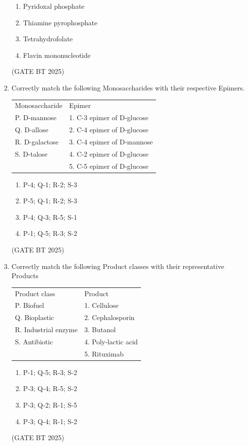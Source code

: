 \documentclass[journal,12pt,onecolumn]{IEEEtran}
\theoremstyle{remark}
\begin{document}
\begin{enumerate}
\begin{enumerate}
    \item Pyridoxal phosphate
    \item Thiamine pyrophosphate
    \item Tetrahydrofolate
    \item Flavin mononucleotide
\end{enumerate}  
\hfill (GATE BT 2025)

\item Correctly match the following Monosaccharides with their respective Epimers.  

\begin{tabular}{ll}
Monosaccharide & Epimer \\
P. D-mannose & 1. C-3 epimer of D-glucose \\
Q. D-allose & 2. C-4 epimer of D-glucose \\
R. D-galactose & 3. C-4 epimer of D-mannose \\
S. D-talose & 4. C-2 epimer of D-glucose \\
 & 5. C-5 epimer of D-glucose
\end{tabular}  

\begin{enumerate}
    \item P-4; Q-1; R-2; S-3
    \item P-5; Q-1; R-2; S-3
    \item P-4; Q-3; R-5; S-1
    \item P-1; Q-5; R-3; S-2
\end{enumerate}  
\hfill (GATE BT 2025)

\item Correctly match the following Product classes with their representative Products  

\begin{tabular}{ll}
Product class & Product \\
P. Biofuel & 1. Cellulose \\
Q. Bioplastic & 2. Cephalosporin \\
R. Industrial enzyme & 3. Butanol \\
S. Antibiotic & 4. Poly-lactic acid \\
 & 5. Rituximab
\end{tabular}  

\begin{enumerate}
    \item P-1; Q-5; R-3; S-2
    \item P-3; Q-4; R-5; S-2
    \item P-3; Q-2; R-1; S-5
    \item P-3; Q-4; R-1; S-2
\end{enumerate}  
\hfill (GATE BT 2025)


\end{enumerate}
\end{document}
